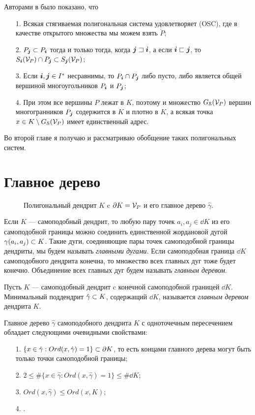 Авторами в \cite[Theorem 4]{TSV2017} было показано, что
\begin{enumerate}[nolistsep]
\item[1.] Всякая стягиваемая полигональная система удовлетворяет (OSC), где  в качестве открытого множества мы можем взять $\dot P$;
\item[2.] $P_{\bm{j}}\subset P_{\bm{i}}$ тогда и только тогда, когда  ${\bm{j}}\sqsupset{\bm{i}}$, а если ${\bm{i}}\sqsubset{\bm{j}}$, то  $ S_{\bm{i}}({\mathcal V}_P)\cap P_{\bm{j}}\subset S_{\bm{j}}({\mathcal V}_P)$;
\item[3.] Если ${\bm{i}},{\bm{j}}\in I^*$ несравнимы, то $P_{\bm{i}}\cap P_{\bm{j}}$ либо пусто, либо является  общей вершиной многоугольников $P_{\bm{i}}$ и  $P_{\bm{j}}$;
\item[4.] При этом все вершины $P$ лежат в $K$, поэтому и множество $G_{\EuScript S}({\mathcal V}_P)$ вершин многогранников $P_{\bm{j}}$ содержится в $K$ и плотно в $K$, а всякая точка $x\in K\setminus G_{\EuScript S}({\mathcal V}_P)$ имеет единственный адрес.
\end{enumerate}
 
Во второй главе я получаю и рассматриваю обобщение таких полигональных систем.



\section{Главное дерево}

\begin{figure}[H]
\caption{Полигональный дендрит $K$ c $\partial K={\mathcal V}_P$ и его главное дерево $\hat\gamma$. }
\label{fig:penta4plus3}
\end{figure}

Если $K$ --- самоподобный дендрит, то любую пару точек $a_i,a_j\in\dd K$ из его самоподобной границы можно соединить единственной жордановой дугой $\gamma(a_i,a_j)\subset K$.
Такие дуги, соединяющие пары точек самоподобной границы дендриты, мы будем называть {\em главными дугами}.
Если самоподобная граница $\dd K$ самоподобного дендрита конечна, то множество всех главных дуг тоже будет конечно.
Объединение всех главных дуг будем называть {\em главным деревом}.

\begin{definition}\label{dfn:MT}
Пусть $K$ --- самоподобный дендрит c конечной самоподобной границей $\dd K$. 
Минимальный поддендрит $\hat\gamma\subset K$, содержащий $\dd K$, называется {\em главным деревом} дендрита $K$.
\end{definition}

Главное дерево $\hat\gamma$ самоподобного дендрита $K$ с одноточечным пересечением обладает следующими очевидными свойствами:
\begin{enumerate}[nolistsep]
\item[1.] $\{x\in\hat\gamma:Ord(x,\hat\gamma)=1\}\subset\partial K$, то есть концами главного дерева могут быть только точки самоподобной границы;
\item[2.] $2\leq\#\{x\in\hat\gamma:Ord(x,\hat\gamma)=1\}\leq\#\dd K$;
\item[3.] $Ord(x,\hat\gamma)\leq Ord(x,K)$;
\item[4.] .
\end{enumerate}

